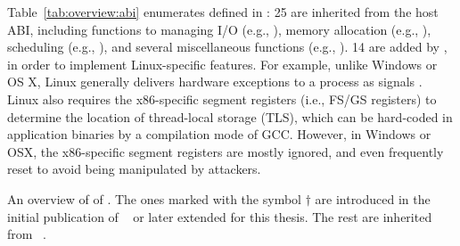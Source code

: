 Table~\ref{tab:overview:abi} enumerates \palcallnum{} \hostapis{} defined in \thehostabi{}:
25 \hostapis{} are inherited from the \drawbridge{} host ABI,
including functions to managing I/O (e.g., ), memory allocation (e.g., ), scheduling (e.g., ), and several miscellaneous functions (e.g., ).
14 \hostapis{} are added by \graphene{}, in order to implement Linux-specific features.
For example, unlike Windows or OS X, Linux generally
delivers hardware exceptions to a process as signals .
Linux also requires 
the x86-specific segment registers (i.e., FS/GS registers)
to determine the location of thread-local storage (TLS), which can be hard-coded in application binaries by a compilation mode of GCC.
However, in Windows or OSX, the x86-specific segment registers are mostly ignored, and even frequently reset to avoid being manipulated by attackers.




\begin{table}[htp!]
\centering

\caption{An overview of \thehostabi{} of \graphene{}. The ones marked with the symbol $\dagger$ are introduced in the initial publication of \graphene{}~\cite{tsai14graphene} or later extended for this thesis. The rest are inherited from \drawbridge{}~\cite{porter11drawbridge}.}
\label{tab:overview:abi}
\end{table}

